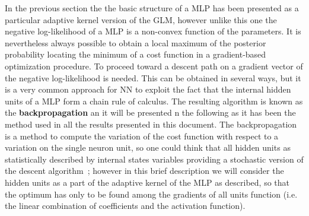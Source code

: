 In the previous section the the basic structure of a \acl{MLP} has been presented as a particular adaptive kernel version of the \acl{GLM}, however unlike this one the negative log-likelihood of a \acl{MLP} is a non-convex function of the parameters. It is nevertheless always possible to obtain a local maximum of the posterior probability locating the minimum of a cost function in a gradient-based optimization procedure. 
To proceed toward a descent path on a gradient vector of the negative log-likelihood is needed. This can be obtained in several ways, but it is a very common approach for NN to exploit the fact that the internal hidden units of a \acl{MLP} form a chain rule of calculus. The resulting algorithm is known as the \textbf{backpropagation} an it will be presented n the following as it has been the method used in all the results presented in this document. The backpropagation is a method to compute the variation of the cost function with respect to a variation on the single neuron unit, so one could think that all hidden units as statistically described by internal states variables providing a stochastic version of the descent algorithm~\cite{rezende2014stochastic}; however in this brief description we will consider the hidden units as a part of the adaptive kernel of the \acl{MLP} as described, so that the optimum has only to be found among the gradients of all units function (i.e. the linear combination of coefficients and the activation function). 

